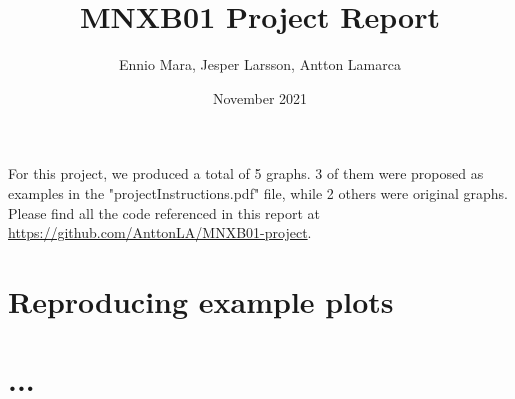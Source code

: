 \documentclass{article}
\title{MNXB01 Project Report}
\author{Ennio Mara, Jesper Larsson, Antton Lamarca }
\date{November 2021}
\begin{document}
\maketitle

For this project, we produced a total of 5 graphs. 3 of them were proposed as examples in the "projectInstructions.pdf" file, while 2 others were original graphs. Please find all the code referenced in this report at \url{https://github.com/AnttonLA/MNXB01-project}.

\section{Reproducing example plots}







\section{...}


\end{document}
